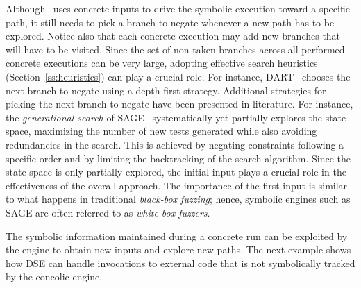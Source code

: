 \vspace{+10pt}
Although \dse\ uses concrete inputs to drive the symbolic execution toward a specific path, it still needs to pick a branch to negate whenever a new path has to be explored. Notice also that each concrete execution may add new branches that will have to be visited. Since the set of non-taken branches across all performed concrete executions can be very large, adopting effective search heuristics (Section~\ref{ss:heuristics}) can play a crucial role. For instance, {\textsc DART}~\cite{DART-PLDI05} chooses the next branch to negate using a depth-first strategy. Additional strategies for picking the next branch to negate have been presented in literature. For instance, the {\em generational search} of {\textsc SAGE}~\cite{SAGE-NDSS08} systematically yet partially explores the state space, maximizing the number of new tests generated while also avoiding redundancies in the search. This is achieved by negating constraints following a specific order and by limiting the backtracking of the search algorithm. Since the state space is only partially explored, the initial input plays a crucial role in the effectiveness of the overall approach.  The importance of the first input is similar to what happens in traditional {\em black-box fuzzing}; hence, symbolic engines such as {\textsc SAGE} are often referred to as {\em white-box fuzzers}.

The symbolic information maintained during a concrete run can be exploited by the engine to obtain new inputs and explore new paths. The next example shows how DSE can handle invocations to external code that is not symbolically tracked by the concolic engine.



